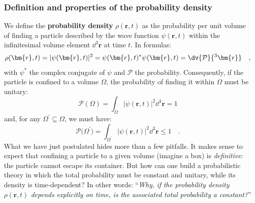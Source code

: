 \subsubsection{Definition and properties of the probability density}
We define the \textbf{probability density} $\rho(\bm{r},t)$ as the probability per unit volume of finding a particle described by the wave function $\psi(\bm{r},t)$ within the infinitesimal volume element $\dd^3{\bm{r}}$ at time $t$. In formulas:
\begin{equation}
    \rho(\bm{r}, t) = |\psi(\bm{r}, t)|^2 = \psi(\bm{r}, t)^*\psi(\bm{r}, t) = \dv{\mathcal{P}}{^3\bm{r}} \quad,
    \label{eq:prob_dens}
\end{equation}
with $\psi^*$ the complex conjugate of $\psi$ and $\mathcal{P}$ the probability. Consequently, if the particle is confined to a volume $\Omega$, the probability of finding it within $\Omega$ must be unitary:
\begin{equation}
        \mathcal{P}(\Omega) = \int_\Omega |\psi(\bm{r}, t)|^2 \dd^3{\bm{r}} = 1
        \label{eq:unit_psi}
\end{equation}
and, for any $\Omega^{'} \subseteq \Omega$, we must have:
\[
    \mathcal{P}\big(\Omega^{'}\big) = \int_{\Omega^{'}} |\psi(\bm{r}, t)|^2 \dd^3{\bm{r}} \leq 1 \quad.
\]
What we have just postulated hides more than a few pitfalls. It makes sense to expect that confining a particle to a given volume (imagine a box) is \emph{definitive}: the particle cannot escape its container. But how can one build a probabilistic theory in which the total probability must be constant and unitary, while its density is time-dependent? In other words: ``\emph{Why, if the probability density $\rho(\bm{r},t)$ depends explicitly on time, is the associated total probability a constant?}''


